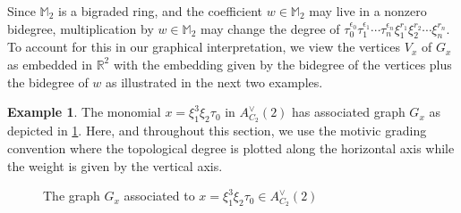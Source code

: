 \documentclass{amsart}
\theoremstyle{definition}
\newtheorem{example}[theorem]{Example}
\theoremstyle{plain}
\numberwithin{theorem}{section}
\numberwithin{equation}{section}
\numberwithin{figure}{section}
\newcommand{\mM}{{\mathbb M}}
\newcommand{\mR}{{\mathbb R}}
\newcommand{\0}{\langle 0 \rangle }
\begin{document}
Since $\mM_2$ is a bigraded ring, and the coefficient $w \in \mM_2$ may live in a nonzero bidegree, multiplication by $w \in \mM_2$ may change the degree of $\tau_0^{\epsilon_0} \tau_1^{\epsilon_1} \cdots \tau_n^{\epsilon_n} \xi_1^{r_1} \xi_2^{r_2} \cdots \xi_n^{r_n}$. To account for this in our graphical interpretation, we view the vertices $V_x$ of $G_x$ as embedded in $\mR^2$ with the embedding given by the { bidegree} of the vertices plus the { bidegree} of $w$ as illustrated in the next two examples.

\begin{example}
The monomial $x= \xi_1^3\xi_2\tau_0$ in $A_{C_2}^\vee(2)$ has associated graph $G_x$ as depicted in \cref{fig:C2graph}. Here, and throughout this section, we use the motivic grading convention where the topological degree is plotted along the horizontal axis while the weight is given by the vertical axis. 
\begin{center}
\begin{figure}[ht]
    \caption{The graph $G_x$ associated to $x = \xi_1^3 \xi_2 \tau_0 \in A_{C_2}^\vee (2)$}
    \label{fig:C2graph}
\end{figure}
\end{center}
\end{example}
\end{document}
